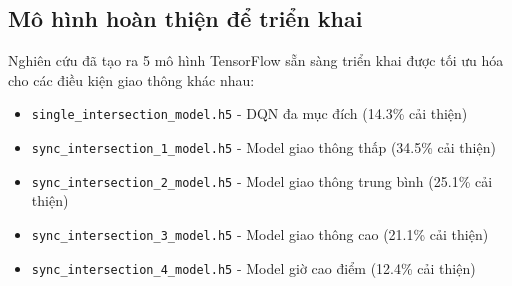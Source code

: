 


\subsection{Mô hình hoàn thiện để triển khai}

Nghiên cứu đã tạo ra 5 mô hình TensorFlow sẵn sàng triển khai được tối ưu hóa cho các điều kiện giao thông khác nhau:

\begin{itemize}
    \item \texttt{single\_intersection\_model.h5} - DQN đa mục đích (14.3\% cải thiện)
    \item \texttt{sync\_intersection\_1\_model.h5} - Model giao thông thấp (34.5\% cải thiện)
    \item \texttt{sync\_intersection\_2\_model.h5} - Model giao thông trung bình (25.1\% cải thiện)  
    \item \texttt{sync\_intersection\_3\_model.h5} - Model giao thông cao (21.1\% cải thiện)
    \item \texttt{sync\_intersection\_4\_model.h5} - Model giờ cao điểm (12.4\% cải thiện)
\end{itemize}

